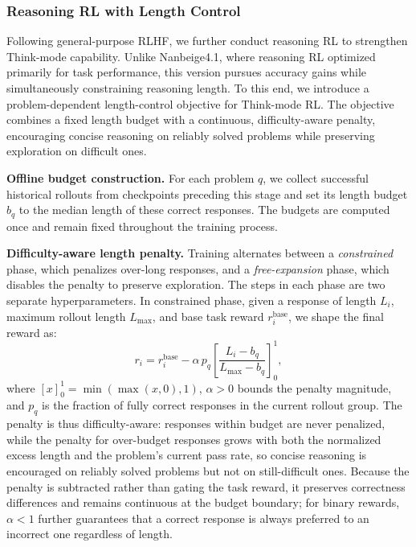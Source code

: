\subsubsection{Reasoning RL with Length Control}

 Following general-purpose RLHF, we further conduct reasoning RL to strengthen Think-mode capability. Unlike Nanbeige4.1, where reasoning RL optimized primarily for task performance, this version pursues accuracy gains while simultaneously constraining reasoning length. To this end, we introduce a problem-dependent length-control objective for Think-mode RL. The objective combines a fixed length budget with a continuous, difficulty-aware penalty, encouraging concise reasoning on reliably solved problems while preserving exploration on difficult ones.

\textbf{Offline budget construction.}
For each problem $q$, we collect successful historical rollouts from checkpoints preceding this stage and set its length budget $b_q$ to the median length of these correct responses. The budgets are computed once and remain fixed throughout the training process.

\textbf{Difficulty-aware length penalty.}
Training alternates between a \emph{constrained} phase, which penalizes
over-long responses, and a \emph{free-expansion} phase, which disables the
penalty to preserve exploration. The steps in each phase are two
separate hyperparameters. In constrained phase, given a response of
length $L_i$, maximum rollout length $L_{\max}$, and base task reward
$r_i^{\mathrm{base}}$, we shape the final reward as:
\begin{equation}
r_i = r_i^{\mathrm{base}} - \alpha\, p_q
\left[\frac{L_i-b_q}{L_{\max}-b_q}\right]_0^1,
\end{equation}
where $[x]_0^1=\min(\max(x,0),1)$, $\alpha>0$ bounds the penalty magnitude, and
$p_q$ is the fraction of fully correct responses in the current rollout group.
The penalty is thus difficulty-aware: responses within budget are never
penalized, while the penalty for over-budget responses grows with both the normalized excess length and the problem's current pass rate, so concise reasoning is encouraged on reliably solved problems but not on still-difficult ones.
Because the penalty is subtracted rather than gating the task reward, it
preserves correctness differences and remains continuous at the budget
boundary; for binary rewards, $\alpha<1$ further guarantees that a correct
response is always preferred to an incorrect one regardless of length.

